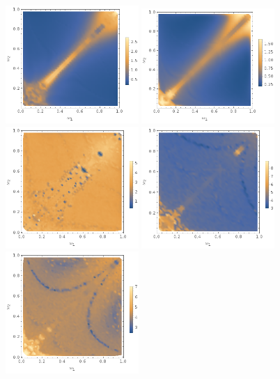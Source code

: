 \documentclass{report}
\begin{document}
\begin{figure}[p]
\begin{adjustwidth}{-1in}{-1in}
    \includegraphics[width=0.45\textwidth]{plot/r_max-axion-2d.png}
    \includegraphics[width=0.45\textwidth]{plot/r_max-axion-3d.png} \\
    \includegraphics[width=0.45\textwidth]{plot/slow-mode-logscale-axion-1d.png}
    \includegraphics[width=0.45\textwidth]{plot/slow-mode-logscale-axion-2d.png}
    \includegraphics[width=0.45\textwidth]{plot/slow-mode-logscale-axion-3d.png}

\end{adjustwidth}
\end{figure}
\end{document}
